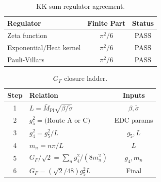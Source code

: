 \begin{table}[ht]
\centering
\caption{KK sum regulator agreement.}
\label{tab:regulator-agreement}
\begin{tabular}{lcc}
\toprule
Regulator & Finite Part & Status \\
\midrule
Zeta function & $\pi^2/6$ & PASS \\
Exponential/Heat kernel & $\pi^2/6$ & PASS \\
Pauli-Villars & $\pi^2/6$ & PASS \\
\bottomrule
\end{tabular}
\end{table}

\begin{table}[ht]
\centering
\caption{$G_F$ closure ladder.}
\label{tab:closure-ladder}
\begin{tabular}{clc}
\toprule
Step & Relation & Inputs \\
\midrule
1 & $L = \bar{M}_{\text{Pl}} \sqrt{\beta/\tilde{\sigma}}$ & $\beta, \tilde{\sigma}$ \\
2 & $g_5^2 = \text{(Route A or C)}$ & EDC params \\
3 & $g_4^2 = g_5^2 / L$ & $g_5, L$ \\
4 & $m_n = n\pi / L$ & $L$ \\
5 & $G_F/\sqrt{2} = \sum_n g_4^2/(8m_n^2)$ & $g_4, m_n$ \\
6 & $G_F = (\sqrt{2}/48) g_5^2 L$ & Final \\
\bottomrule
\end{tabular}
\end{table}
